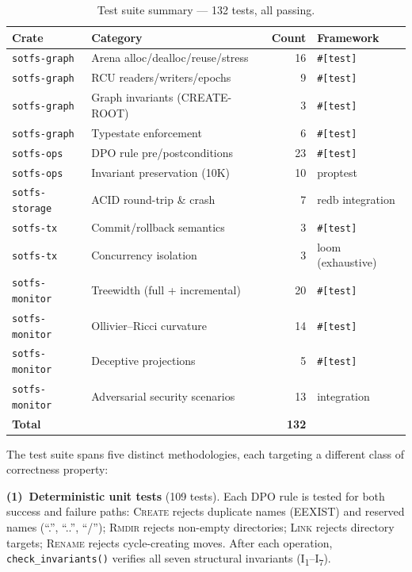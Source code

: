 \documentclass[11pt,a4paper]{article}
\theoremstyle{definition}
\begin{document}
\begin{table}[h]
\centering
\caption{Test suite summary --- 132 tests, all passing.}
\label{tab:tests}
\begin{tabularx}{\textwidth}{llrX}
\toprule
\textbf{Crate} & \textbf{Category} & \textbf{Count} & \textbf{Framework} \\
\midrule
\texttt{sotfs-graph}   & Arena alloc/dealloc/reuse/stress & 16 & \texttt{\#[test]} \\
\texttt{sotfs-graph}   & RCU readers/writers/epochs       &  9 & \texttt{\#[test]} \\
\texttt{sotfs-graph}   & Graph invariants (CREATE-ROOT)   &  3 & \texttt{\#[test]} \\
\texttt{sotfs-graph}   & Typestate enforcement            &  6 & \texttt{\#[test]} \\
\texttt{sotfs-ops}     & DPO rule pre/postconditions      & 23 & \texttt{\#[test]} \\
\texttt{sotfs-ops}     & Invariant preservation (10K)     & 10 & proptest \\
\texttt{sotfs-storage} & ACID round-trip \& crash          &  7 & redb integration \\
\texttt{sotfs-tx}      & Commit/rollback semantics        &  3 & \texttt{\#[test]} \\
\texttt{sotfs-tx}      & Concurrency isolation            &  3 & loom (exhaustive) \\
\texttt{sotfs-monitor} & Treewidth (full + incremental)   & 20 & \texttt{\#[test]} \\
\texttt{sotfs-monitor} & Ollivier--Ricci curvature        & 14 & \texttt{\#[test]} \\
\texttt{sotfs-monitor} & Deceptive projections            &  5 & \texttt{\#[test]} \\
\texttt{sotfs-monitor} & Adversarial security scenarios   & 13 & integration \\
\midrule
\textbf{Total} & & \textbf{132} & \\
\bottomrule
\end{tabularx}
\end{table}

The test suite spans five distinct methodologies, each targeting a different
class of correctness property:

\textbf{(1)~Deterministic unit tests} (109 tests).  Each DPO rule is tested
for both success and failure paths: \textsc{Create} rejects duplicate names
(EEXIST) and reserved names (``.'', ``..{}'', ``/''); \textsc{Rmdir} rejects
non-empty directories; \textsc{Link} rejects directory targets;
\textsc{Rename} rejects cycle-creating moves.  After each operation,
\texttt{check\_invariants()} verifies all seven structural invariants
(I\textsubscript{1}--I\textsubscript{7}).
\end{document}
